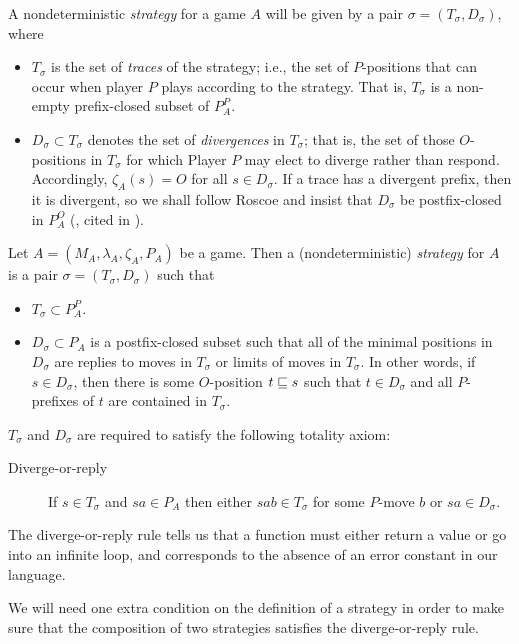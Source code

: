 \documentclass{article}
\begin{document}
A nondeterministic \emph{strategy} for a game $A$ will be given by a pair $\sigma=(T_\sigma, D_\sigma)$, where
\begin{itemize}
  \item $T_\sigma$ is the set of \emph{traces} of the strategy; i.e., the set of $P$-positions that can occur when player $P$ plays according to the strategy.  That is, $T_\sigma$ is a non-empty prefix-closed subset of $P_A^P$.  

  \item $D_\sigma\subset T_\sigma$ denotes the set of \emph{divergences} in $T_\sigma$; that is, the set of those $O$-positions in $T_\sigma$ for which Player $P$ may elect to diverge rather than respond.  Accordingly, $\zeta_A(s)=O$ for all $s\in D_\sigma$.  If a trace has a divergent prefix, then it is divergent, so we shall follow Roscoe and insist that $D_\sigma$ be postfix-closed in $P_A^O$ (\cite{RoscoeCspInfinite}, cited in \cite{mcCHFiniteND}).
\end{itemize}

\begin{definition}
  Let $A=(M_A,\lambda_A,\zeta_A,P_A)$ be a game.  Then a (nondeterministic) \emph{strategy} for $A$ is a pair $\sigma=(T_\sigma,D_\sigma)$ such that
  \begin{itemize}
    \item $T_\sigma\subset P_A^P$.
    \item $D_\sigma\subset P_A$ is a postfix-closed subset such that all of the minimal positions in $D_\sigma$ are replies to moves in $T_\sigma$ or limits of moves in $T_\sigma$.  In other words, if $s\in D_\sigma$, then there is some $O$-position $t\sqsubseteq s$ such that $t\in D_\sigma$ and all $P$-prefixes of $t$ are contained in $T_\sigma$.
  \end{itemize}

  $T_\sigma$ and $D_\sigma$ are required to satisfy the following totality axiom:
  \begin{description}
    \item[Diverge-or-reply] If $s\in T_\sigma$ and $sa\in P_A$ then either $sab\in T_\sigma$ for some $P$-move $b$ or $sa\in D_\sigma$.  
  \end{description}

  The diverge-or-reply rule tells us that a function must either return a value or go into an infinite loop, and corresponds to the absence of an error constant in our language.  
\end{definition}

We will need one extra condition on the definition of a strategy in order to make sure that the composition of two strategies satisfies the diverge-or-reply rule.
\end{document}

